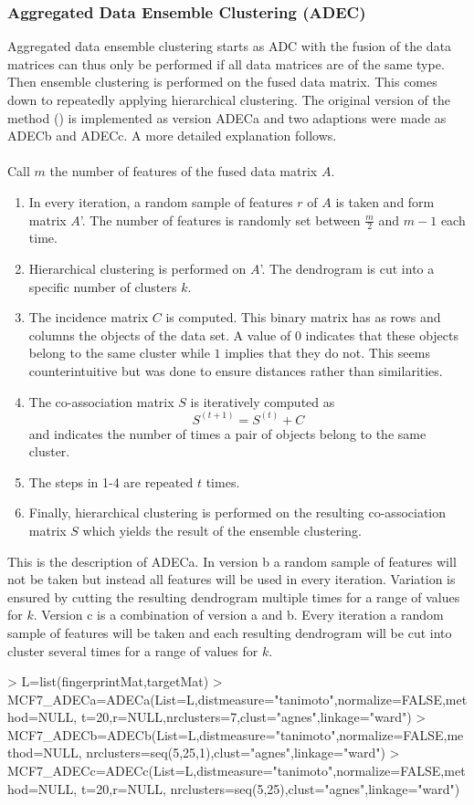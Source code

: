 \documentclass[a4paper]{article}
\begin{document}
\subsubsection{Aggregated Data Ensemble Clustering (ADEC)}
Aggregated data ensemble clustering starts as ADC with the
fusion of the data matrices can thus only be performed if all data matrices are
of the same type. Then ensemble clustering is performed on the fused data
matrix. This comes down to repeatedly applying hierarchical clustering. The
original version of the method (\cite{Fodeh2013}) is implemented as version
ADECa and two adaptions were made as ADECb and ADECc. A more detailed
explanation follows.\\ \\
Call $m$ the number of features of the fused data matrix $A$.
\begin{enumerate}
\item In every iteration, a random sample of features $r$ of $A$ is taken and
form matrix $A$'. The number of features is randomly set between $\frac{m}{2}$
and $m-1$ each time.
\item Hierarchical clustering is performed on $A$'. The dendrogram is cut into a
specific number of clusters $k$.
\item The incidence matrix $C$ is computed. This binary matrix has as rows and
columns the objects of the data set. A value of $0$ indicates that these
objects belong to the same cluster while $1$ implies that they do not. This
seems counterintuitive but was done to ensure distances rather than
similarities.
\item The co-association matrix $S$ is iteratively computed as
$$S^{(t+1)}=S^{(t)}+C$$ and indicates the number of times a pair of objects
belong to the same cluster.
\item The steps in 1-4 are repeated $t$ times.
\item Finally, hierarchical clustering is performed on the resulting
co-association matrix $S$ which yields the result of the ensemble clustering.
\end{enumerate}
\noindent This is the description of ADECa. In version b a random sample of
features will not be taken but instead all features will be used in every
iteration. Variation is ensured by cutting the resulting dendrogram multiple
times for a range of values for $k$. Version c is a combination of version a and
b. Every iteration a random sample of features will be taken and each resulting
dendrogram will be cut into cluster several times for a range of values for $k$.
\begin{Schunk}
\begin{Sinput}
> L=list(fingerprintMat,targetMat)
> MCF7_ADECa=ADECa(List=L,distmeasure="tanimoto",normalize=FALSE,method=NULL,
                  t=20,r=NULL,nrclusters=7,clust="agnes",linkage="ward")
> MCF7_ADECb=ADECb(List=L,distmeasure="tanimoto",normalize=FALSE,method=NULL,
                  nrclusters=seq(5,25,1),clust="agnes",linkage="ward")
> MCF7_ADECc=ADECc(List=L,distmeasure="tanimoto",normalize=FALSE,method=NULL,
                  t=20,r=NULL, nrclusters=seq(5,25),clust="agnes",linkage="ward")
\end{Sinput}
\end{Schunk}
\end{document}
